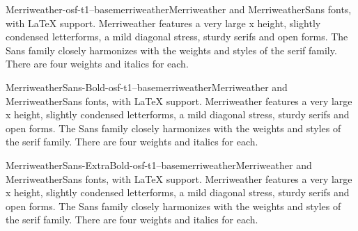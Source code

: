 \documentclass{ddltxtyp}
\begin{document}
\begin{package}{Merriweather-osf-t1--base}{merriweather}{Merriweather and MerriweatherSans fonts, with {\LaTeX} support.}
Merriweather features a very large x height, slightly condensed
letterforms, a mild diagonal stress, sturdy serifs and open
forms. The Sans family closely harmonizes with the weights and
styles of the serif family. There are four weights and italics
for each.
\end{package}
\begin{package}{MerriweatherSans-Bold-osf-t1--base}{merriweather}{Merriweather and MerriweatherSans fonts, with {\LaTeX} support.}
Merriweather features a very large x height, slightly condensed
letterforms, a mild diagonal stress, sturdy serifs and open
forms. The Sans family closely harmonizes with the weights and
styles of the serif family. There are four weights and italics
for each.
\end{package}
\begin{package}{MerriweatherSans-ExtraBold-osf-t1--base}{merriweather}{Merriweather and MerriweatherSans fonts, with {\LaTeX} support.}
Merriweather features a very large x height, slightly condensed
letterforms, a mild diagonal stress, sturdy serifs and open
forms. The Sans family closely harmonizes with the weights and
styles of the serif family. There are four weights and italics
for each.
\end{package}
\end{document}
